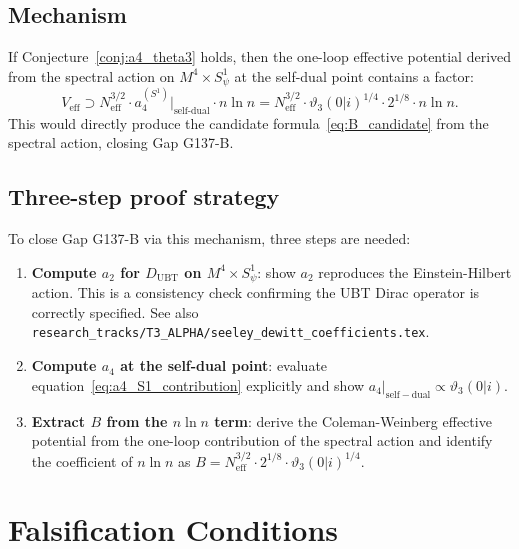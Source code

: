 \documentclass[12pt,a4paper]{article}
\theoremstyle{remark}
\begin{document}
\subsection{Mechanism}

If Conjecture~\ref{conj:a4_theta3} holds, then the one-loop effective potential
derived from the spectral action on $M^4\times S^1_\psi$ at the self-dual point
contains a factor:
\begin{equation}
  V_{\mathrm{eff}} \supset
  N_{\mathrm{eff}}^{3/2}\cdot a_4^{(S^1)}\big|_{\mathrm{self\text{-}dual}}
  \cdot n\ln n
  = N_{\mathrm{eff}}^{3/2}\cdot\vartheta_3(0|i)^{1/4}\cdot 2^{1/8}\cdot n\ln n.
\end{equation}
This would directly produce the candidate formula~\eqref{eq:B_candidate} from
the spectral action, closing Gap G137-B.

\subsection{Three-step proof strategy}

To close Gap G137-B via this mechanism, three steps are needed:

\begin{enumerate}
  \item \textbf{Compute $a_2$ for $D_{\mathrm{UBT}}$ on $M^4\times S^1_\psi$}:
    show $a_2$ reproduces the Einstein-Hilbert action.  This is a consistency
    check confirming the UBT Dirac operator is correctly specified.
    See also \texttt{research\_tracks/T3\_ALPHA/seeley\_dewitt\_coefficients.tex}.

  \item \textbf{Compute $a_4$ at the self-dual point}:
    evaluate equation~\eqref{eq:a4_S1_contribution} explicitly and show
    $a_4|_{\mathrm{self-dual}} \propto \vartheta_3(0|i)$.

  \item \textbf{Extract $B$ from the $n\ln n$ term}:
    derive the Coleman-Weinberg effective potential from the one-loop
    contribution of the spectral action and identify the coefficient of
    $n\ln n$ as $B = N_{\mathrm{eff}}^{3/2}\cdot 2^{1/8}\cdot\vartheta_3(0|i)^{1/4}$.
\end{enumerate}

\section{Falsification Conditions}
\label{sec:falsification}
\end{document}
